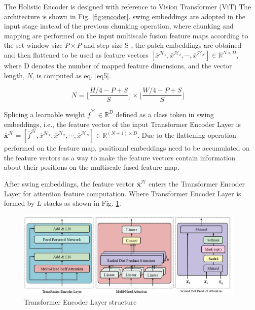 The Holistic Encoder is designed with reference to Vision Transformer (ViT) \cite{4} The architecture is shown in Fig. \ref{fig:encoder}. swing embeddings \cite{24} are adopted in the input stage instead of the previous chunking operation, where chunking and mapping are performed on the input multiscale fusion feature maps according to the set window size $P\times P$ and step size S , the patch embeddings are obtained and then flattened to be used as feature vectors $[\overline{x}^{\mathcal{H}_1},\overline{x}^{\mathcal{H}_2},\cdots ,\overline{x}^{\mathcal{H}_N}] \in \mathbb{R}^{N\times D}$, where D denotes the number of mapped feature dimensions, and the vector length, $N$, is computed as eq. \ref{eq5}.


\begin{equation}
\label{eq5}
  N=\lfloor \frac{H/4-P+S}{S}\rfloor \times \lfloor \frac{W/4-P+S}{S}\rfloor
\end{equation}

Splicing a learnable weight $\overline{f}^{\mathcal{H}}\in \mathbb{R}^D$ defined as a class token in swing embeddings, i.e., the feature vector of the input Transformer Encoder Layer is $\overline{\boldsymbol{x}}^\mathcal{H}=[\overline{f}^\mathcal{H},\overline{x}^{\mathcal{H}_1},\overline{x}^{\mathcal{H}_2},\cdots ,\overline{x}^{\mathcal{H}_N} ] \in \mathbb{R}^{(N+1)\times D}$. Due to the flattening operation performed on the feature map, positional embeddings \cite{36} need to be accumulated on the feature vectors as a way to make the feature vectors contain information about their positions on the multiscale fused feature map.

After swing embeddings, the feature vector $\overline{\boldsymbol{x}}^\mathcal{H}$ enters the Transformer Encoder Layer for attention feature computation. Where Transformer Encoder Layer is formed by $L$ stacks as shown in Fig. \ref{fig:mhsa}.

\begin{figure}[H]
  \begin{center}
      \includegraphics[scale=0.55]{figure/mhsa.jpg}
  \end{center}
  \caption{Transformer Encoder Layer structure}
  \label{fig:mhsa}
\end{figure}


